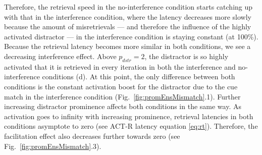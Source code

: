 \documentclass{cambridge7A}\usepackage[]{graphicx}\usepackage[]{color}
\begin{document}
Therefore, the retrieval speed in the no-interference condition starts catching up with that in the interference condition, where the latency decreases more slowly because the amount of misretrievals --- and therefore the influence of the highly activated distractor --- in the interference condition is staying constant (at 100\%).
Because the retrieval latency becomes more similar in both conditions, we see a decreasing interference effect.
Above $p_{dstr}=2$, the distractor is so highly activated that it is retrieved in every iteration in both the interference and no-interference conditions (d). At this point, the only difference between both conditions is the constant activation boost for the distractor due to the cue match in the interference condition (Fig.~\ref{fig:promEnsMismatch}.1). Further increasing distractor prominence affects both conditions in the same way.
As activation goes to infinity with increasing prominence, retrieval latencies in both conditions asymptote to zero (see ACT-R latency equation \ref{eq:rt}). Therefore, the facilitation effect also decreases further towards zero (see Fig.~\ref{fig:promEnsMismatch}.3).
\end{document}
